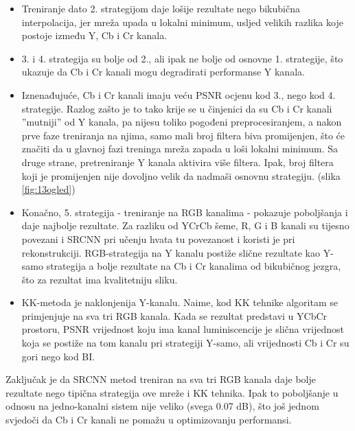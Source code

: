 \documentclass[12pt]{report}
\numberwithin{equation}{section}
\begin{document}
  \begin{itemize}
  
   \item Treniranje dato 2. strategijom daje lošije rezultate nego bikubična interpolacija, jer mreža upada u lokalni minimum, usljed velikih razlika koje postoje između Y, Cb i Cr kanala. 
   \item 3. i 4. strategija su bolje od 2., ali ipak ne bolje od osnovne 1. strategije, što ukazuje da Cb i Cr kanali mogu degradirati performanse Y kanala.
   \item Iznenađujuće, Cb i Cr kanali imaju veću PSNR ocjenu kod 3., nego kod 4. strategije. Razlog zašto je to tako krije se u činjenici da su Cb i Cr kanali ''mutniji'' od Y kanala, pa nijesu toliko pogođeni preprocesiranjem, a nakon prve faze treniranja na njima, samo mali broj filtera biva promijenjen, što će značiti da u glavnoj fazi treninga mreža zapada u loši lokalni minimum. Sa druge strane, pretreniranje Y kanala aktivira više filtera. Ipak, broj filtera koji je promijenjen nije dovoljno velik da nadmaši osnovnu strategiju. (slika \ref{fig:13ogled})
   \item Konačno, 5. strategija - treniranje na RGB kanalima - pokazuje poboljšanja i daje najbolje rezultate. Za razliku od YCrCb šeme, R, G i B kanali su tijesno povezani i SRCNN pri učenju hvata tu povezanost i koristi je pri rekonstrukciji. RGB-strategija na Y kanalu postiže slične rezultate kao Y-samo strategija a bolje rezultate na Cb i Cr kanalima od bikubičnog jezgra, što za rezultat ima kvalitetniju sliku. 
   
   \item KK-metoda je naklonjenija Y-kanalu. Naime, kod KK tehnike algoritam se primjenjuje na sva tri RGB kanala. Kada se rezultat predstavi u YCbCr prostoru, PSNR vrijednost koju ima kanal luminiscencije je slična vrijednost koja se postiže na tom kanalu pri strategiji Y-samo, ali vrijednosti Cb i Cr su gori nego kod BI.  
   
  \end{itemize}
 

  
Zaključak je da SRCNN metod treniran na sva tri RGB kanala daje bolje rezultate nego tipična strategija ove mreže i KK tehnika. Ipak to poboljšanje u odnosu na jedno-kanalni sistem nije veliko (svega 0.07 dB), što još jednom svjedoči da Cb i Cr kanali ne pomažu u optimizovanju performansi. 
\end{document}
